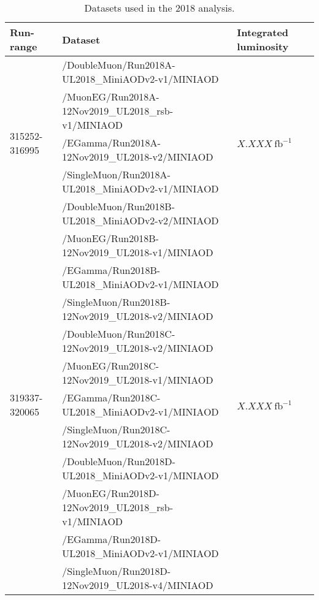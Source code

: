\begin{table}[h]
	\scriptsize
	\centering
	\begin{tabular}{|l|l|l|} 
		\hline %
		\hline %
		Run-range & Dataset & Integrated luminosity \\
		\hline %
		\hline %
		\multirow{5}{*}{315252-316995} & /DoubleMuon/Run2018A-UL2018\_MiniAODv2-v1/MINIAOD &  \multirow{5}{*}{$X.XXX\ \text{fb}^{-1}$} \\ 
		& /MuonEG/Run2018A-12Nov2019\_UL2018\_rsb-v1/MINIAOD &  \\ 
		& /EGamma/Run2018A-12Nov2019\_UL2018-v2/MINIAOD &  \\ 
		& /SingleMuon/Run2018A-UL2018\_MiniAODv2-v1/MINIAOD &  \\ 
		\hline
		\multirow{5}{*}{317080-319310} & /DoubleMuon/Run2018B-UL2018\_MiniAODv2-v2/MINIAOD &  \multirow{5}{*}{$X.XXX\ \text{fb}^{-1}$}  \\  
		& /MuonEG/Run2018B-12Nov2019\_UL2018-v1/MINIAOD &  \\ 
		& /EGamma/Run2018B-UL2018\_MiniAODv2-v1/MINIAOD &  \\ 
		& /SingleMuon/Run2018B-12Nov2019\_UL2018-v2/MINIAOD &  \\ 
		\hline
		\multirow{5}{*}{319337-320065} & /DoubleMuon/Run2018C-12Nov2019\_UL2018-v2/MINIAOD &  \multirow{5}{*}{$X.XXX\ \text{fb}^{-1}$} \\ 
		& /MuonEG/Run2018C-12Nov2019\_UL2018-v1/MINIAOD &  \\ 
		& /EGamma/Run2018C-UL2018\_MiniAODv2-v1/MINIAOD &  \\ 
		& /SingleMuon/Run2018C-12Nov2019\_UL2018-v2/MINIAOD &  \\ 
		\hline
		\multirow{5}{*}{320673-325175} & /DoubleMuon/Run2018D-UL2018\_MiniAODv2-v1/MINIAOD &  \multirow{5}{*}{$X.XXX\ \text{fb}^{-1}$} \\  
		& /MuonEG/Run2018D-12Nov2019\_UL2018\_rsb-v1/MINIAOD &  \\ 
		& /EGamma/Run2018D-UL2018\_MiniAODv2-v1/MINIAOD &  \\ 
		& /SingleMuon/Run2018D-12Nov2019\_UL2018-v4/MINIAOD &  \\ 
		\hline
		\hline
	\end{tabular}
	\small
	\caption{Datasets used in the 2018 analysis. }
	\label{tab:datasets_dataC}
\end{table}


